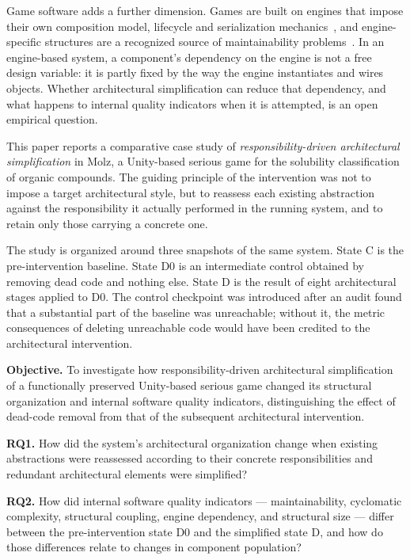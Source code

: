 \documentclass{sbc2019}%
\begin{document}
Game software adds a further dimension. Games are built on engines that impose
their own composition model, lifecycle and serialization mechanics~\cite{aleem2016,politowski2025}, and engine-specific structures are a
recognized source of maintainability problems~\cite{nardone2023,borrelli2020}. In an engine-based system, a component's
dependency on the engine is not a free design variable: it is partly fixed by
the way the engine instantiates and wires objects. Whether architectural
simplification can reduce that dependency, and what happens to internal quality
indicators when it is attempted, is an open empirical question.

This paper reports a comparative case study of \emph{responsibility-driven
architectural simplification} in Molz, a Unity-based serious game for the
solubility classification of organic compounds. The guiding principle of the
intervention was not to impose a target architectural style, but to reassess
each existing abstraction against the responsibility it actually performed in
the running system, and to retain only those carrying a concrete one.

The study is organized around three snapshots of the same system. State C is
the pre-intervention baseline. State D0 is an intermediate control obtained by
removing dead code and nothing else. State D is the result of eight
architectural stages applied to D0. The control checkpoint was introduced after
an audit found that a substantial part of the baseline was unreachable; without
it, the metric consequences of deleting unreachable code would have been
credited to the architectural intervention.

\medskip\noindent\textbf{Objective.} To investigate how responsibility-driven
architectural simplification of a functionally preserved Unity-based serious
game changed its structural organization and internal software quality
indicators, distinguishing the effect of dead-code removal from that of the
subsequent architectural intervention.

\medskip\noindent\textbf{RQ1.} How did the system's architectural organization
change when existing abstractions were reassessed according to their concrete
responsibilities and redundant architectural elements were simplified?

\medskip\noindent\textbf{RQ2.} How did internal software quality indicators ---
maintainability, cyclomatic complexity, structural coupling, engine dependency,
and structural size --- differ between the pre-intervention state D0 and the
simplified state D, and how do those differences relate to changes in component
population?
\end{document}
